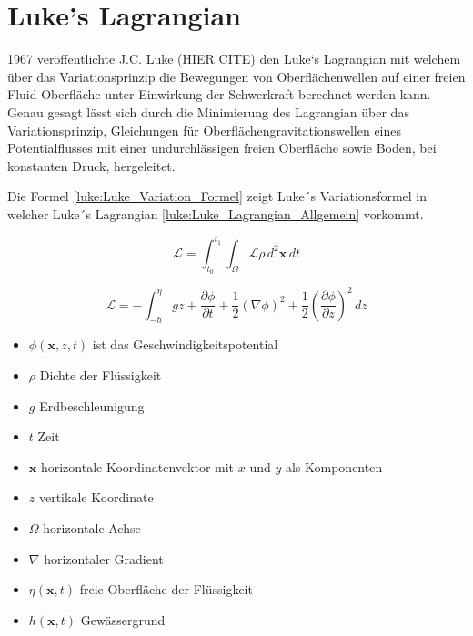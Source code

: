 %
%
%
%
\section{Luke's Lagrangian\label{luke:section:teil0}}

1967 veröffentlichte J.C. Luke (HIER CITE) den Luke`s Lagrangian mit welchem über das Variationsprinzip die Bewegungen von Oberflächenwellen auf einer freien Fluid Oberfläche unter Einwirkung der Schwerkraft berechnet werden kann.
Genau gesagt lässt sich durch die Minimierung des Lagrangian über das Variationsprinzip, Gleichungen für Oberflächengravitationswellen eines Potentialflusses mit einer undurchlässigen freien Oberfläche sowie Boden, bei konstanten Druck, hergeleitet.

Die Formel \eqref{luke:Luke_Variation_Formel} zeigt Luke´s Variationsformel in welcher Luke´s Lagrangian \eqref{luke:Luke_Lagrangian_Allgemein} vorkommt.

\begin{equation}
	\mathcal{L} 
	=
	\int_{t_0}^{t_1} \int_{\Omega}^{} \mathscr{L} \rho \, d^2\bm{x}\, dt
	\label{luke:Luke_Variation_Formel}
\end{equation}

\begin{equation}
	\mathscr{L}
	=
	-\int_{-h}^{\eta} g z + \frac{\partial\phi}{\partial t}+ \frac{1}{2}(\nabla\phi)^2 + \frac{1}{2}(\frac{\partial\phi}{\partial z})^2\, dz
	\label{luke:Luke_Lagrangian_Allgemein}
\end{equation}

\begin{itemize}
	\item
	$\phi(\bm{x},z,t)$ ist das Geschwindigkeitspotential
	\item
	$\rho$ Dichte der Flüssigkeit
	\item
	$g$ Erdbeschleunigung
	\item
	$t$ Zeit
	\item 
	$\bm{x}$ horizontale Koordinatenvektor mit $x$ und $y$ als Komponenten
	\item 
	$z$ vertikale Koordinate
	\item 
	$\Omega$ horizontale Achse 
	\item 
	$\nabla$ horizontaler Gradient
	\item 
	$\eta(\bm{x},t)$ freie Oberfläche der Flüssigkeit
	\item 
	$h(\bm{x},t)$ Gewässergrund 
	
\end{itemize}

